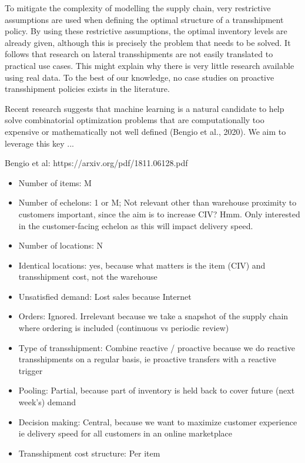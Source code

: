 \documentclass[../../main.tex]{subfiles}
\begin{document}
To mitigate the complexity of modelling the supply chain, very restrictive assumptions are used when defining the optimal structure of a transshipment policy. By using these restrictive assumptions, the optimal inventory levels are already given, although this is precisely the problem that needs to be solved. It follows that research on lateral transshipments are not easily translated to practical use cases. This might explain why there is very little research available using real data. To the best of our knowledge, no case studies on proactive transshipment policies exists in the literature.
 
Recent research suggests that machine learning is a natural candidate to help solve combinatorial optimization problems that are computationally too expensive or mathematically not well defined (Bengio et al., 2020). We aim to leverage this key ...

Bengio et al: https://arxiv.org/pdf/1811.06128.pdf




\begin{itemize}
\item Number of items: M
\item Number of echelons: 1 or M; Not relevant other than warehouse proximity to customers important, since the aim is to increase CIV? Hmm. Only interested in the customer-facing echelon as this will impact delivery speed.
\item Number of locations: N
\item Identical locations: yes, because what matters is the item (CIV) and transshipment cost, not the warehouse
\item Unsatisfied demand: Lost sales because Internet
\item Orders: Ignored. Irrelevant because we take a snapshot of the supply chain where ordering is included (continuous vs periodic review)
\item Type of transshipment: Combine reactive / proactive because we do reactive transshipments on a regular basis, ie proactive transfers with a reactive trigger
\item Pooling: Partial, because part of inventory is held back to cover future (next week's) demand
\item Decision making: Central, because we want to maximize customer experience ie delivery speed for all customers in an online marketplace
\item Transshipment cost structure: Per item
\end{itemize}
\end{document}
